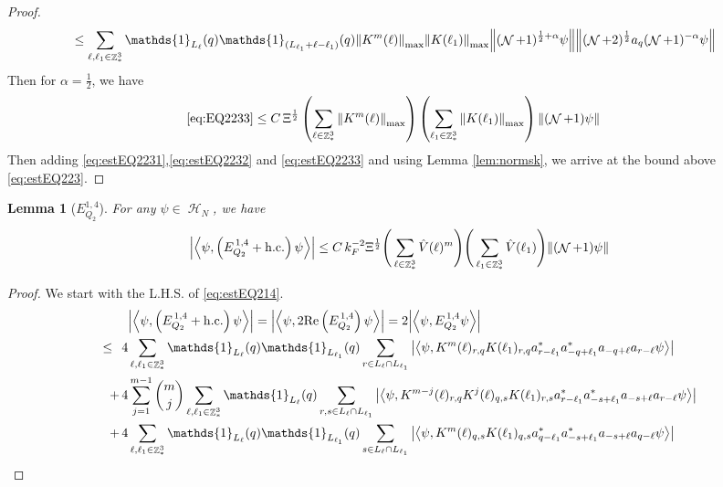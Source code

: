 \documentclass[sn-mathphys, Numbered ,a4paper]{sn-jnl}%
\DeclareMathOperator{\Z}{\mathbb{Z}}
\DeclareMathOperator{\HH}{\mathcal{H}}
\DeclareMathOperator{\NN}{\mathcal{N}}
\newcommand{\half}{\frac{1}{2}}
\newcommand{\eva}[1]{\left\langle #1 \right\rangle}
\theoremstyle{plain}
\newtheorem{lemma}[theorem]{Lemma}
\theoremstyle{definition}
\theoremstyle{remark}
\theoremstyle{plain}
\theoremstyle{definition}
\theoremstyle{remark}
\begin{document}
{\begin{proof}
\begin{align}
		&\leq \sum\limits_{\ell, \ell_1\in \Z^3_*} \mathds{1}_{L_{\ell}}(q) \mathds{1}_{(L_{\ell_1}+\ell-\ell_1)}(q) \norm{K^m{(\ell)}}_{\mathrm{max}} \norm{K(\ell_1)}_{\mathrm{max}} \norm{ (\NN+1)^{\half+\alpha}\psi} \norm{  (\NN+2)^\half  a_{q} (\NN+1)^{-\alpha} \psi } \nonumber
	\end{align} 
	Then for $\alpha = \half$, we have
	\begin{align}
		\eqref{eq:EQ2233}&\leq C\, \Xi^\half \left(\sum\limits_{\ell\in \Z^3_*} \norm{K^m(\ell)}_{\mathrm{max}}\right)\left(  \sum\limits_{ \ell_1\in \Z^3_*}  \norm{ K(\ell_1)}_{\mathrm{max}} \right) \norm{ (\NN+1) \psi}\label{eq:estEQ2233} 
	\end{align}
	Then adding \eqref{eq:estEQ2231},\eqref{eq:estEQ2232} and \eqref{eq:estEQ2233} and using Lemma \ref{lem:normsk}, we arrive at the bound above \eqref{eq:estEQ223}. 
\end{proof}
\begin{lemma}[$E_{Q_2}^{1,4}$]
	For any $\psi \in \HH_N$, we have
	\begin{align}
		\abs{\eva{\psi,\left(E^{\,1,4}_{Q_2}+\mathrm{h.c.}\right) \psi }}
	\leq  C\, k_{F}^{-2} \Xi^{\half} \Bigg(\sum\limits_{\ell \in \Z^3_*} \hat{V}(\ell)^m \Bigg) \Bigg( \sum\limits_{\ell_1 \in \Z^3_*}\hat{V}(\ell_1) \Bigg)  \norm { (\NN+1) \psi } \label{eq:estEQ214}
	\end{align}
\end{lemma}
\begin{proof}
	We start with the L.H.S. of \eqref{eq:estEQ214}.
	\begin{align}
		&\abs{\eva{\psi,\left(E^{\,1,4}_{Q_2}+\mathrm{h.c.}\right) \psi }} = \abs{\eva{\psi,2\mathrm{Re}\left(E^{\,1,4}_{Q_2}\right) \psi }} = 2\abs{\eva{\psi, E^{\,1,4}_{Q_2} \psi }}\nonumber\\
		\leq\,\;4& \sum\limits_{\ell, \ell_1\in \Z^3_*} \mathds{1}_{L_{\ell}}(q) \mathds{1}_{L_{\ell_1}}(q) \sum\limits_{r\in L_{\ell} \cap L_{\ell_1}} \abs{\eva{\psi,  K^m(\ell)_{r,q}K(\ell_1)_{r,q}a^*_{r-\ell_1}a^*_{-q+\ell_1} a_{-q+\ell}a_{r-\ell} \psi }}\label{eq:EQ2141}\\
		+\,4& \sum\limits_{j=1}^{m-1} {{m}\choose j} \sum\limits_{\ell, \ell_1\in \Z^3_*}\mathds{1}_{L_{\ell}}(q) \sum\limits_{r,s \in L_{\ell} \cap L_{\ell_1}}  \abs{\eva{\psi, K^{m-j}(\ell)_{r,q} K^{j}(\ell)_{q,s} K(\ell_1)_{r,s} a^*_{r-\ell_1} a^*_{-s+\ell_1} a_{-s+\ell} a_{r-\ell} \psi }} \label{eq:EQ2142}\\
		+\,4&\sum\limits_{\ell, \ell_1\in \Z^3_*} \mathds{1}_{L_{\ell}}(q) \mathds{1}_{L_{\ell_1}}(q) \sum\limits_{s \in L_{\ell} \cap L_{\ell_1}} \abs{\eva{\psi,  K^m(\ell)_{q,s}K(\ell_1)_{q,s}a^*_{q-\ell_1}a^*_{-s+\ell_1} a_{-s+\ell}a_{q-\ell} \psi }}\label{eq:EQ2143}

\end{align}
\end{proof}}
\end{document}
